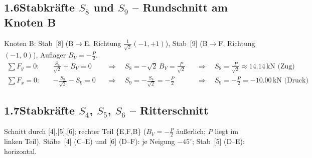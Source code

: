 \documentclass[a4paper,11pt]{article}
\begin{document}
\begin{center}
\end{center}


\subsection*{1.6\quad Stabkräfte $S_8$ und $S_9$ -- Rundschnitt am Knoten B}

Knoten B: Stab~[8] (B$\to$E, Richtung $\tfrac{1}{\sqrt{2}}(-1,+1)$),
Stab~[9] (B$\to$F, Richtung $(-1,\,0)$), Auflager $B_V = -\tfrac{P}{2}$.
\begin{align*}
  \sum F_y = 0:\quad & \tfrac{S_8}{\sqrt{2}} + B_V = 0
    &&\Rightarrow\quad S_8 = -\sqrt{2}\,B_V = \tfrac{P}{\sqrt{2}}
       &&\Rightarrow\quad \boxed{S_8 = \tfrac{P}{\sqrt{2}} \approx 14.14\,\text{kN (Zug)}} \\
  \sum F_x = 0:\quad & -\tfrac{S_8}{\sqrt{2}} - S_9 = 0
    &&\Rightarrow\quad S_9 = -\tfrac{S_8}{\sqrt{2}} = -\tfrac{P}{2}
       &&\Rightarrow\quad \boxed{S_9 = -\tfrac{P}{2} = -10.00\,\text{kN (Druck)}}
\end{align*}

\subsection*{1.7\quad Stabkräfte $S_4$, $S_5$, $S_6$ -- Ritterschnitt}

Schnitt durch [4],[5],[6]; rechter Teil \{E,F,B\} ($B_V = -\tfrac{P}{2}$ äußerlich; $P$ liegt im linken Teil).
Stäbe~[4] (C--E) und [6] (D--F): je Neigung $-45^\circ$; Stab~[5] (D--E): horizontal.
\end{document}
